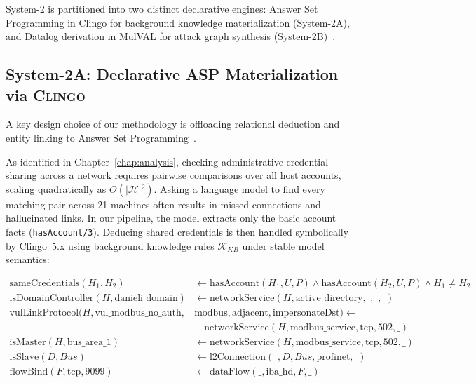 \documentclass[target=mst,aauheader=aics,style=]{thud}
\begin{document}
System-2 is partitioned into two distinct declarative engines: Answer Set Programming in Clingo for background knowledge materialization (System-2A), and Datalog derivation in MulVAL for attack graph synthesis (System-2B)~\cite{alviano2025llmasp}.

\subsection{System-2A: Declarative ASP Materialization via \textsc{Clingo}}
A key design choice of our methodology is offloading relational deduction and entity linking to Answer Set Programming~\cite{clingo}. 

As identified in Chapter~\ref{chap:analysis}, checking administrative credential sharing across a network requires pairwise comparisons over all host accounts, scaling quadratically as $O(\vert{}\mathcal{H}\vert{}^2)$. Asking a language model to find every matching pair across 21 machines often results in missed connections and hallucinated links. In our pipeline, the model extracts only the basic account facts (\texttt{hasAccount/3}). Deducing shared credentials is then handled symbolically by Clingo~5.x using background knowledge rules $\mathcal{K}_{KB}$ under stable model semantics:

\begin{align}
    \text{sameCredentials}(H_1, H_2) &\leftarrow \text{hasAccount}(H_1, U, P) \land \text{hasAccount}(H_2, U, P) \land H_1 \neq H_2 \label{eq:kb_samecred} \\
    \text{isDomainController}(H, \text{danieli\_domain}) &\leftarrow \text{networkService}(H, \text{active\_directory}, \_, \_, \_) \label{eq:kb_dc} \\
    \text{vulLinkProtocol}(H, \text{vul\_modbus\_no\_auth}, &\text{modbus}, \text{adjacent}, \text{impersonateDst}) \leftarrow \nonumber \\
    &\quad \text{networkService}(H, \text{modbus\_service}, \text{tcp}, 502, \_) \label{eq:kb_vullink} \\
    \text{isMaster}(H, \text{bus\_area\_1}) &\leftarrow \text{networkService}(H, \text{modbus\_service}, \text{tcp}, 502, \_) \\
    \text{isSlave}(D, \mathit{Bus}) &\leftarrow \text{l2Connection}(\_, D, \mathit{Bus}, \text{profinet}, \_) \label{eq:kb_slave} \\
    \text{flowBind}(F, \text{tcp}, 9099) &\leftarrow \text{dataFlow}(\_, \text{iba\_hd}, F, \_) \label{eq:kb_flowbind}
\end{align}
\end{document}

